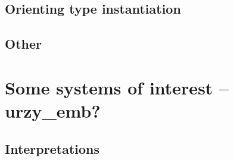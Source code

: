 \documentclass[runningheads,a4paper]{llncs}
\begin{document}
\subsection{Orienting type instantiation}

\subsection{Other}

\section{Some systems of interest -- urzy\_emb?}

\subsection{Interpretations}
\end{document}
